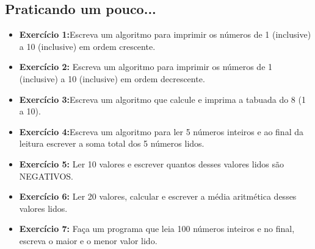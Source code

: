 \documentclass{article}
\begin{document}
\subsection{Praticando um pouco...}

\begin{itemize}
    \item \textbf{Exercício 1:}Escreva um algoritmo para imprimir os números de 1 (inclusive) a 10 (inclusive) em ordem crescente.
    \item \textbf{Exercício 2:} Escreva um algoritmo para imprimir os números de 1 (inclusive) a 10 (inclusive) em ordem decrescente.
    \item \textbf{Exercício 3:}Escreva um algoritmo que calcule e imprima a tabuada do 8 (1 a 10).
    \item \textbf{Exercício 4:}Escreva um algoritmo para ler 5 números inteiros e ao final da leitura escrever a soma total dos 5 números lidos.
    \item \textbf{Exercício 5:} Ler 10 valores e escrever quantos desses valores lidos são NEGATIVOS.
    \item \textbf{Exercício 6:} Ler 20 valores, calcular e escrever a média aritmética desses valores lidos.
    \item \textbf{Exercício 7:} Faça um programa que leia 100 números inteiros e no final, escreva o maior e o menor valor lido.
\end{itemize}
\end{document}
